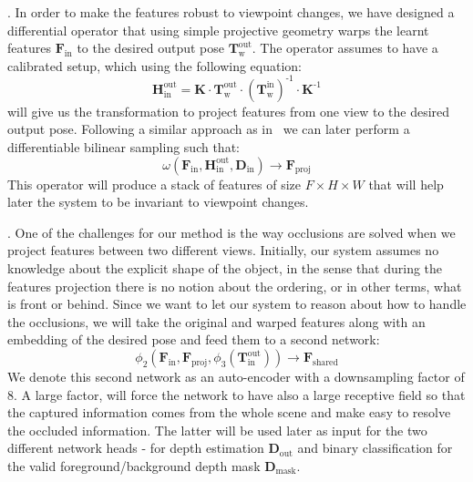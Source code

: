 \vspace{1mm}
. In order to make the features robust to viewpoint changes, we have designed a differential operator that using simple projective geometry warps the learnt features $\mathbf{F}_{\textrm{in}}$ to the desired output pose $\mathbf{T}_{\textrm{w}}^{\textrm{out}}$. The operator assumes to have a calibrated setup, which using the following equation:
\begin{equation}
    \mathbf{H}_{\textrm{in}}^{\textrm{out}} = \mathbf{K} \cdot \mathbf{T}_{\textrm{w}}^{\textrm{out}} \cdot (\mathbf{T}_{\textrm{w}}^{\textrm{in}})^{\textrm{-1}} \cdot \mathbf{K}^{\textrm{-1}}
\end{equation}
 will give us the transformation to project features from one view to the desired output pose. Following a similar approach as in~\cite{NIPS2015_5854, eriba2020kornia} we can later perform a differentiable bilinear sampling such that:
 \begin{equation}
    \omega(\mathbf{F}_{\textrm{in}}, \mathbf{H}_{\textrm{in}}^{\textrm{out}}, \mathbf{D}_{\textrm{in}}) \rightarrow \mathbf{F}_{\textrm{proj}}
 \end{equation}
This operator will produce a stack of features of size $F\times H \times W$ that will help later the system to be invariant to viewpoint changes.

\vspace{1mm}
. One of the challenges for our method is the way occlusions are solved when we project features between two different views. Initially, our system assumes no knowledge about the explicit shape of the object, in the  sense that during the features projection there is no notion about the ordering,  or in other terms, what is front or behind. Since we want to let our system to reason about how to handle the occlusions, we will take the original and warped features along with an embedding of the desired pose and feed  them to a second network:
\begin{equation}
    \phi_2(\mathbf{F}_{\textrm{in}}, \mathbf{F}_{\textrm{proj}}, \phi_3(\mathbf{T}_{\textrm{in}}^{\textrm{out}})) \rightarrow \mathbf{F}_{\textrm{shared}}
\end{equation}
We denote this second network as an auto-encoder with a downsampling factor of $8$. A large factor, will force the network to have also a large receptive field so that the captured information comes from the whole scene and make easy to resolve the occluded information. The latter will be used later as input for the two different network heads - for depth estimation $\mathbf{D}_{\textrm{out}}$ and binary classification for the valid foreground/background depth mask $\mathbf{D}_{\textrm{mask}}$.

